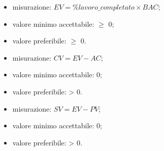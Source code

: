 			\begin{itemize}
				\item{misurazione: $EV = \%lavoro\_completato \times BAC$;}
				\item{valore minimo accettabile: $\geq$ 0;}
				\item{valore preferibile: $\geq$ 0.}
			\end{itemize}

			\begin{itemize}
				\item{misurazione: $CV = EV - AC$;}
				\item{valore minimo accettabile: 0;}
				\item{valore preferibile: > 0.}
			\end{itemize}
		
			\begin{itemize}
				\item{misurazione: $SV = EV - PV$;}
				\item{valore minimo accettabile: 0;}
				\item{valore preferibile: > 0.}
			\end{itemize}